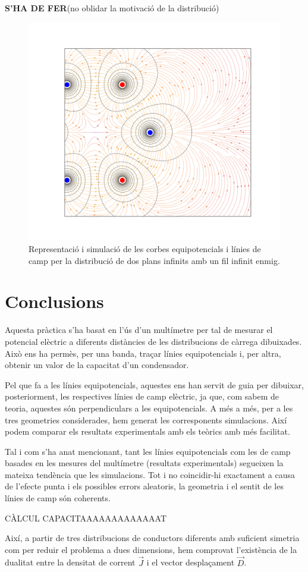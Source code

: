 \documentclass[a4paper,10.5pt]{report}
\begin{document}
 
\textbf{S'HA DE FER}(no oblidar la motivació de la distribució)


\begin{figure}[h]
	\centering
	\includegraphics[width=0.49\linewidth]{figV2imagenes}
	\caption{Representació i simulació de les corbes equipotencials i línies de camp per la distribució de dos plans infinits amb un fil infinit enmig.}
	\label{fig:1.4}
\end{figure}

\section{Conclusions}
Aquesta pràctica s'ha basat en l'ús d'un multímetre per tal de mesurar el potencial elèctric a diferents distàncies de les distribucions de càrrega dibuixades. Això ens ha permès, per una banda, traçar línies equipotencials i, per altra, obtenir un valor de la capacitat d'un condensador.

Pel que fa a les línies equipotencials, aquestes ens han servit de guia per dibuixar, posteriorment, les respectives línies de camp elèctric, ja que, com sabem de teoria, aquestes són perpendiculars a les equipotencials. A més a més, per a les tres geometries considerades, hem generat les corresponents simulacions. Així podem comparar els resultats experimentals amb els teòrics amb més facilitat.

Tal i com s'ha anat mencionant, tant les línies equipotencials com les de camp basades en les mesures del multímetre (resultats experimentals) segueixen la mateixa tendència que les simulacions. Tot i no coincidir-hi exactament a causa de l'efecte punta i els possibles errors aleatoris, la geometria i el sentit de les línies de camp són coherents.

CÀLCUL CAPACITAAAAAAAAAAAAAT

Així, a partir de tres distribucions de conductors diferents amb suficient simetria com per reduir el problema a dues dimensions, hem comprovat l'existència de la dualitat entre la densitat de corrent $\vec{J}$ i el vector desplaçament $\vec{D}$.
\end{document}
